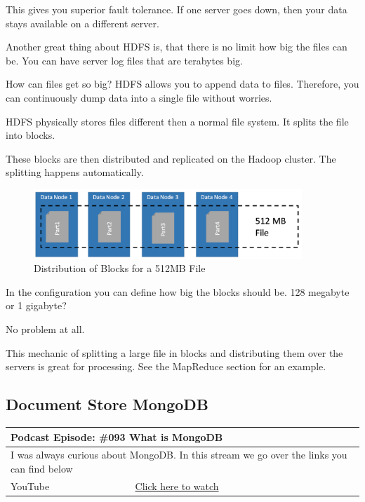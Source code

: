 \documentclass[12pt, numbers=noenddot]{scrreprt} %
\begin{document}
This gives you superior fault tolerance. If one server goes down, then your data stays available on a different server.

Another great thing about HDFS is, that there is no limit how big the files can be. You can have server log files that are terabytes big.

How can files get so big? HDFS allows you to append data to files. Therefore, you can continuously dump data into a single file without worries.

HDFS physically stores files different then a normal file system. It splits the file into blocks.

These blocks are then distributed and replicated on the Hadoop cluster. The splitting happens automatically.

\begin{figure}[htbp]
  \centering
     \includegraphics[width=0.9\textwidth]{images/HDFS-Distributed-FileSystem}
  \caption{Distribution of Blocks for a 512MB File}
  \label{fig:Bild1}
\end{figure}

In the configuration you can define how big the blocks should be. 128 megabyte or 1 gigabyte?

No problem at all.

This mechanic of splitting a large file in blocks and distributing them over the servers is great for processing.
See the MapReduce section for an example.

\subsection{Document Store MongoDB}

\begin{table}[h]
\begin{tabular}{ll}
\hline
\multicolumn{2}{l}{\textbf{Podcast Episode:} \#093 What is MongoDB} \\ \hline
\multicolumn{2}{p{15cm}}{I was always curious about MongoDB. In this stream we go over the links you can find below}         \\ \hline
\multicolumn{1}{l|}{YouTube}   & \href{https://youtu.be/U05knQN29FA}{Click here to watch}   \\  \hline
\end{tabular}
\end{table}
\end{document}
